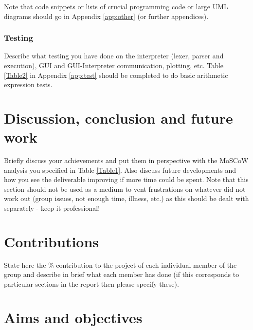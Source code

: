 \documentclass[a4paper, oneside, 11pt]{report}
\begin{document}
Note that code snippets or lists of crucial programming code or large UML diagrams should go in Appendix \ref{app:other} (or further appendices).

\subsection{Testing}

Describe what testing you have done on the interpreter (lexer, parser and execution), GUI and GUI-Interpreter communication, plotting, etc. Table \ref{Table2} in Appendix \ref{app:test} should be completed to do basic arithmetic expression tests.


\chapter{Discussion, conclusion and future work}

Briefly discuss  your achievements and put them in perspective with the MoSCoW analysis you specified in Table \ref{Table1}. Also discuss future developments and how you see the deliverable improving if more time could be spent. Note that this section should not be used as a medium to vent frustrations on whatever did not work out (group issues, not enough time, illness, etc.) as this should be dealt with separately - keep it professional!



\raggedright



\appendix
\chapter{Contributions}

State here the \% contribution to the project of each individual member of the group and describe in brief what each member has done (if this corresponds to particular sections in the report then please specify these).

\chapter{Aims and objectives}
\end{document}
